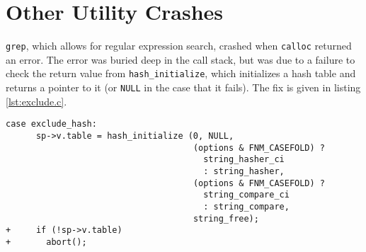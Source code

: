 \section{Other Utility Crashes}
\label{appendix:other_gnu}

\texttt{grep}, which allows for regular expression search, crashed when \texttt{calloc} returned an error. The error was buried deep in the call stack, but was due to a failure to check the return value from \texttt{hash\_initialize}, which initializes a hash table and returns a pointer to it (or \texttt{NULL} in the case that it fails). The fix is given in listing \ref{lst:exclude.c}.

\begin{lstlisting}[label={lst:exclude.c},firstnumber=265, caption={\texttt{lib/exclude.c}.}]
	case exclude_hash:
	  sp->v.table = hash_initialize (0, NULL,
	                                 (options & FNM_CASEFOLD) ?
	                                   string_hasher_ci
	                                   : string_hasher,
	                                 (options & FNM_CASEFOLD) ?
	                                   string_compare_ci
	                                   : string_compare,
	                                 string_free);
+	  if (!sp->v.table)
+	    abort();
                                          
\end{lstlisting}